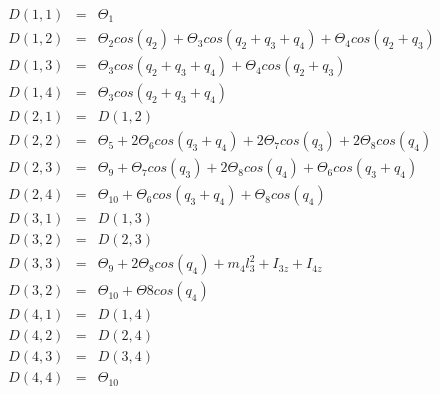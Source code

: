 \documentclass[letterpaper, 10 pt, journal, twocolumn]{IEEEtran}  %
\theoremstyle{plain}
\theoremstyle{definition}
\theoremstyle{remark}
\begin{document}
%
%
\begin{eqnarray}
	D(1,1) &=& \Theta_1\nonumber\\
	D(1,2) &=& \Theta_{2}cos(q_{2}) + \Theta_{3}cos(q_{2} + q_{3} + q_{4}) + \Theta_{4}cos(q_{2} + q_{3})\nonumber\\
	D(1,3) &=& \Theta_{3}cos(q_{2} + q_{3} + q_{4}) + \Theta_{4}cos(q_{2} + q_{3})\nonumber\\
	D(1,4) &=& \Theta_{3}cos(q_{2} + q_{3} + q_{4}) \nonumber \\
	D(2,1) &=& D(1,2)\nonumber \\
	D(2,2) &=& \Theta_{5} + 2\Theta_{6}cos(q_{3} + q_{4}) + 2\Theta_{7}cos(q_{3}) + 2\Theta_{8}cos(q_{4})\nonumber \\
	D(2,3) &=& \Theta_{9} + \Theta_{7}cos(q_{3}) + 2\Theta_{8}cos(q_{4}) + \Theta_{6}cos(q_{3} + q_{4})\nonumber \\
	D(2,4) &=& \Theta_{10} + \Theta_{6}cos(q_{3} + q_{4}) + \Theta_{8}cos(q_{4}) \nonumber \\
	D(3,1) &=& D(1,3)\nonumber \\
	D(3,2) &=& D(2,3)\nonumber \\
	D(3,3) &=& \Theta_{9} + 2\Theta_{8}cos(q_{4}) + m_{4}l_{3}^2 + I_{3z} + I_{4z} \nonumber \\
	D(3,2) &=& \Theta_{10} + \Theta{8}cos(q_{4}) \nonumber \\
	D(4,1) &=& D(1,4)\nonumber \\
	D(4,2) &=& D(2,4)\nonumber \\
	D(4,3) &=& D(3,4)\nonumber \\
	D(4,4) &=& \Theta_{10} \nonumber \\
	\label{eq:Inertia}
\end{eqnarray}
%
%
\end{document}
